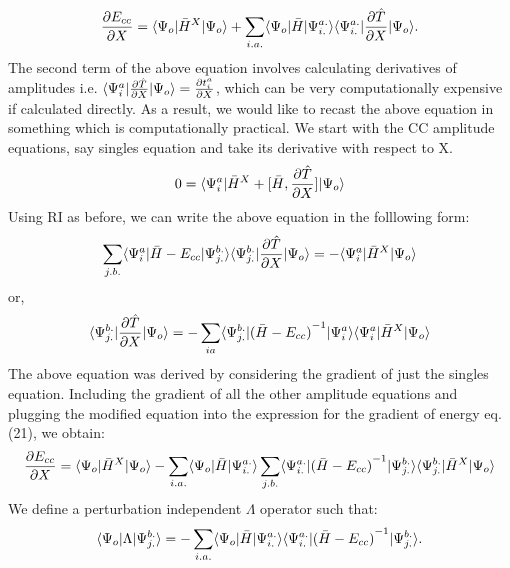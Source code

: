 \begin{equation}
\frac{\partial{E_{cc}}}{\partial X} = \langle \Psi_o |{\bar{H}}^X| \Psi_o \rangle + \sum_{i.a.}\langle \Psi_o |\bar{H}| {\Psi}^{a.}_{i.} \rangle\langle {\Psi}^{a.}_{i.} |\frac{\partial{\hat T}}{\partial X}| \Psi_o \rangle.
\end{equation}
The second term of the above equation involves calculating derivatives of
amplitudes i.e. $\langle {\Psi}^{a}_{i} |\frac{\partial{\hat T}}{\partial
X}| \Psi_o \rangle = \frac{\partial{t^a_i}}{\partial X}$, which can be very
computationally expensive if calculated directly. As a result, we would like to
recast the above equation in something which is computationally practical. We
start with the CC amplitude equations, say singles equation and take
its derivative with respect to X.
\begin{equation} 
0 = \langle {\Psi}^a_i |{\bar{H}}^X + \lbrack\bar H , \frac{\partial{\hat T}}{\partial
X}\rbrack| \Psi_o \rangle 
\end{equation} 
Using RI as before, we can write the above equation in the folllowing form:
\begin{equation}
\sum_{j.b.}\langle {\Psi}^a_i |\bar{H}-E_{cc}| {\Psi}^{b.}_{j.} \rangle\langle {\Psi}^{b.}_{j.} |\frac{\partial{\hat T}}{\partial X}| \Psi_o \rangle = - \langle {\Psi}^a_i |{\bar{H}}^X| \Psi_o \rangle 
\end{equation}
or,
\begin{equation} \langle {\Psi}^{b.}_{j.} |\frac{\partial{\hat T}}{\partial
X}| \Psi_o \rangle = -\sum_{ia}
\langle {\Psi}^{b.}_{j.} |{(\bar{H}-E_{cc})}^{-1}| {\Psi}^a_i \rangle\langle {\Psi}^a_i |{\bar{H}}^X| \Psi_o \rangle
\end{equation}
The above equation was derived by considering the gradient of just the singles equation.
Including the gradient of all the other amplitude equations and plugging the modified 
equation into the expression for the gradient of energy eq.(21), we obtain:
\begin{equation}
\frac{\partial{E_{cc}}}{\partial X} = \langle \Psi_o |{\bar{H}}^X| \Psi_o \rangle -
\sum_{i.a.}\langle \Psi_o |\bar{H}| {\Psi}^{a.}_{i.} \rangle\sum_{j.b.}
\langle {\Psi}^{a.}_{i.} |{(\bar{H}-E_{cc})}^{-1}| {\Psi}^{b.}_{j.} \rangle
\langle {\Psi}^{b.}_{j.} |{\bar{H}}^X| \Psi_o \rangle
\end{equation}
We define a perturbation independent $\Lambda$ operator such that:
\begin{equation}
\langle \Psi_o |\Lambda| \Psi^{b.}_{j.} \rangle = -\sum_{i.a.}\langle \Psi_o |\bar{H}| {\Psi}^{a.}_{i.} \rangle
\langle {\Psi}^{a.}_{i.} |{(\bar{H}-E_{cc})}^{-1}| {\Psi}^{b.}_{j.} \rangle.
\end{equation}
